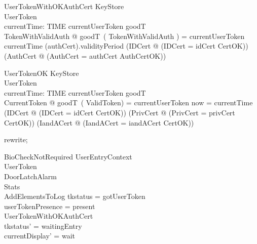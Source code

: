 \begin{schema}{UserTokenWithOKAuthCert}
  KeyStore\\
  UserToken\\
  currentTime: TIME
\where
  currentUserToken \in  \ran  goodT\\
  \exists  TokenWithValidAuth @ goodT~( \theta  TokenWithValidAuth ) = currentUserToken \land  currentTime \in  (\The authCert).validityPeriod \land  (\exists  IDCert @ (\theta  IDCert = idCert \land  CertOK)) \land  (\exists  AuthCert @ (\theta  AuthCert = \The authCert \land  AuthCertOK))
\end{schema}


\begin{schema}{UserTokenOK}
  KeyStore\\
  UserToken\\
  currentTime: TIME
\where
  currentUserToken \in  \ran  goodT\\
  \exists  CurrentToken @ goodT~( \theta  ValidToken) = currentUserToken \land  now = currentTime \land  (\exists  IDCert @ (\theta  IDCert = idCert \land  CertOK)) \land  (\exists  PrivCert @ (\theta  PrivCert = privCert \land  CertOK)) \land  (\exists  IandACert @ (\theta  IandACert = iandACert \land  CertOK))
\end{schema}

\begin{zproof}
rewrite;
\end{zproof}

\begin{schema}{BioCheckNotRequired}
  UserEntryContext\\
  \Xi UserToken\\
  \Xi DoorLatchAlarm\\
  \Xi Stats\\
  AddElementsToLog
\where
  tkstatus = gotUserToken\\
  userTokenPresence = present\\
  UserTokenWithOKAuthCert\\
  tkstatus' = waitingEntry\\
  currentDisplay' = wait
\end{schema}

